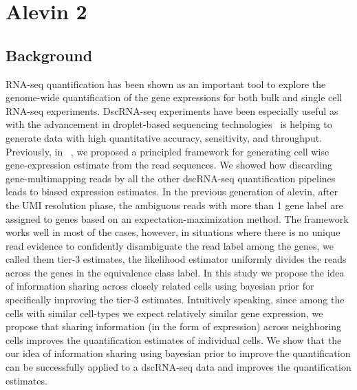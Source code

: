 
\chapter{Alevin 2} %

\label{alevin2} %


\section{Background}

RNA-seq quantification has been shown as an important tool to explore the genome-wide
quantification of the gene expressions for both bulk and single cell RNA-seq experiments.
DscRNA-seq experiments have been especially useful as with the advancement in droplet-based 
sequencing technologies~\citet{dropseq, indrop, tenx} is helping to generate data with high quantitative 
accuracy, sensitivity, and throughput. Previously, in ~, we proposed a principled 
framework for generating cell wise gene-expression estimate from the read sequences. We showed how 
discarding gene-multimapping reads by all the other dscRNA-seq quantification pipelines leads to 
biased expression estimates. In the previous generation of alevin, after the UMI resolution phase, 
the ambiguous reads with more than 1 gene label are assigned to genes based on an expectation-maximization 
method. The framework works well in most of the cases, however, in situations where there is no unique 
read evidence to confidently disambiguate the read label among the genes, we called them 
tier-3 estimates, the likelihood estimator uniformly divides the reads across the genes in the 
equivalence class label. In this study we propose the idea of information sharing across closely 
related cells using bayesian prior for specifically improving the tier-3 estimates. Intuitively speaking, 
since among the cells with similar cell-types we expect relatively similar gene expression, we propose that 
sharing information (in the form of expression) across neighboring cells improves the quantification 
estimates of individual cells. We show that the our idea of information sharing using bayesian 
prior to improve the quantification can be successfully applied to a dscRNA-seq data and improves the 
quantification estimates.

